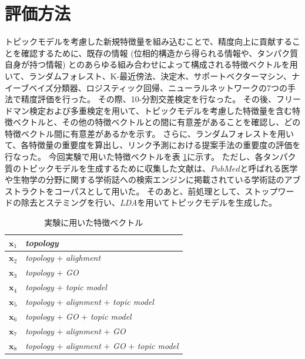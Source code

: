\documentclass[titlepage,12pt]{jreport}
\begin{document}
\section{評価方法\label{experimental-method}}
トピックモデルを考慮した新規特徴量を組み込むことで、精度向上に貢献することを確認するために、既存の情報 (位相的構造から得られる情報や、タンパク質自身が持つ情報) とのあらゆる組み合わせによって構成される特徴ベクトルを用いて、ランダムフォレスト、K-最近傍法、決定木、サポートベクターマシン、ナイーブベイズ分類器、ロジスティック回帰、ニューラルネットワークの7つの手法で精度評価を行った。 その際、10-分割交差検定を行なった。 その後、フリードマン検定および多重検定を用いて、トピックモデルを考慮した特徴量を含む特徴ベクトルと、その他の特徴ベクトルとの間に有意差があることを確認し、どの特徴ベクトル間に有意差があるかを示す。 さらに、ランダムフォレストを用いて、各特徴量の重要度を算出し、リンク予測における提案手法の重要度の評価を行なった。
今回実験で用いた特徴ベクトルを表 \ref{fig:vector}に示す。 ただし、各タンパク質のトピックモデルを生成するために収集した文献は、$PubMed$と呼ばれる医学や生物学の分野に関する学術誌への検索エンジンに掲載されている学術誌のアブストラクトをコーパスとして用いた。 そのあと、前処理として、ストップワードの除去とステミングを行い、{\it LDA}を用いてトピックモデルを生成した。
\begin{table}[tbp]
	\begin{center}
		\caption{実験に用いた特徴ベクトル}
		\begin{tabular}{|c|p{12cm}|} \hline
			$\bm{x}_1$ & {\it topology}\footnotemark \\ \hline
			$\bm{x}_2$ & {\it topology} + {\it alighment}\footnotemark[2] \\ \hline
			$\bm{x}_3$ & {\it topology} + {\it GO}\footnotemark[3]\\ \hline
			$\bm{x}_4$ & {\it topology} + {\it topic model}\footnotemark[4]\\ \hline
			$\bm{x}_5$ & {\it topology} + {\it alignment} + {\it topic model}\\ \hline
			$\bm{x}_6$ & {\it topology} + {\it GO} + {\it topic model}\\ \hline
			$\bm{x}_7$ & {\it topology} + {\it alignment} + {\it GO}\\ \hline
			$\bm{x}_8$ & {\it topology} + {\it alignment} + {\it GO} + {\it topic model}\\ \hline
		\end{tabular}
		\label{fig:vector}
	\end{center}
\end{table}
\end{document}

